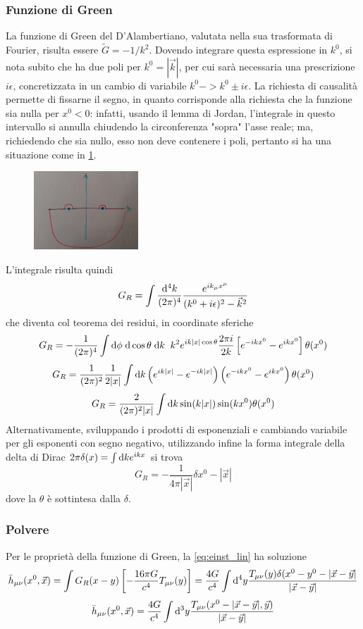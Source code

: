 \subsubsection{Funzione di Green}
La funzione di Green del D'Alambertiano, valutata nella sua trasformata di Fourier, risulta essere \( \tilde{G} =- 1/k^2 \). Dovendo integrare questa espressione in $k^0$, si nota subito che ha due poli per \( k^0 = |\vec{k}| \), per cui sar\`a necessaria una prescrizione $i\epsilon$, concretizzata in un cambio di variabile \( k^0 -> k^0 \pm i\epsilon \). La richiesta di causalit\`a permette di fissarne il segno, in quanto corrisponde alla richiesta che la funzione sia nulla per \( x^0 < 0\):  infatti, usando il lemma di Jordan, l'integrale in questo intervallo si annulla chiudendo la circonferenza "sopra" l'asse reale; ma, richiedendo che sia nullo, esso non deve contenere i poli, pertanto si ha una situazione come in \ref{figure:green}.


\begin{figure}[htbp]
 \centering
 \includegraphics[angle=90, width=0.35\textwidth]{images/foglio5_circuito}
	\caption*{}
 \label{figure:green}
\end{figure}

L'integrale risulta quindi
\[ G_R = \int \frac{\mathrm{d} ^4k}{(2\pi)^4} \frac{e^{ik_\mu x^\mu}}{ (k^0+i\epsilon)^2 - \vec{k}^2 } \]
che diventa col teorema dei residui, in coordinate sferiche
\[ G_R = -\frac{1}{(2\pi)^4} \int \mathrm{d} \phi \; \mathrm{d} \cos\theta \;\mathrm{d} k \;\; k^2 e^{ ik|x|\cos\theta} \frac{2\pi i}{2k} \left[e^{-ikx^0} - e^{ikx^0}\right] \theta(x^0)    \]
\[ G_R = \frac{1}{(2\pi)^2} \frac{1}{2|x|} \int \mathrm{d} k \left( e^{ik|x|} - e^{-ik|x|}\right) \left(e^{-ikx^0} - e^{ikx^0} \right)\theta(x^0)  \]
\[ G_R = \frac{2}{(2\pi)^2 |x|} \int \mathrm{d} k \sin(k|x|) \sin(kx^0) \theta(x^0) \]
Alternativamente, sviluppando i prodotti di esponenziali e cambiando variabile per gli esponenti con segno negativo, utilizzando infine la forma integrale della delta di Dirac \( 2\pi\delta(x) = \int \mathrm{d} k e^{ikx} \) si trova
\[ G_R = -\frac{1}{4\pi|\vec{x}|}\delta{x^0-|\vec{x}|} \]
dove la $\theta$ \`e sottintesa dalla $\delta$.

\subsubsection{Polvere}
Per le propriet\`a della funzione di Green, la \ref{eq:einst_lin} ha soluzione
\[ \bar{h}_{\mu\nu} (x^0,\vec{x}) = \int G_R(x-y) \left[ -\frac{16\pi G}{c^4} T_{\mu\nu}(y) \right] 
		= \frac{4G}{c^4} \int \mathrm{d} ^4y \frac{ T_{\mu\nu}(y) \delta(x^0-y^0-|\vec{x}- \vec{y}|}{|\vec{x}-\vec{y}|} \]
\[ \bar{h}_{\mu\nu} (x^0,\vec{x}) = \frac{4G}{c^4} \int \mathrm{d} ^3y \frac{ T_{\mu\nu}(x^0-|\vec{x}-\vec{y}|, \vec{y})}{|\vec{x}-\vec{y}|} \]

